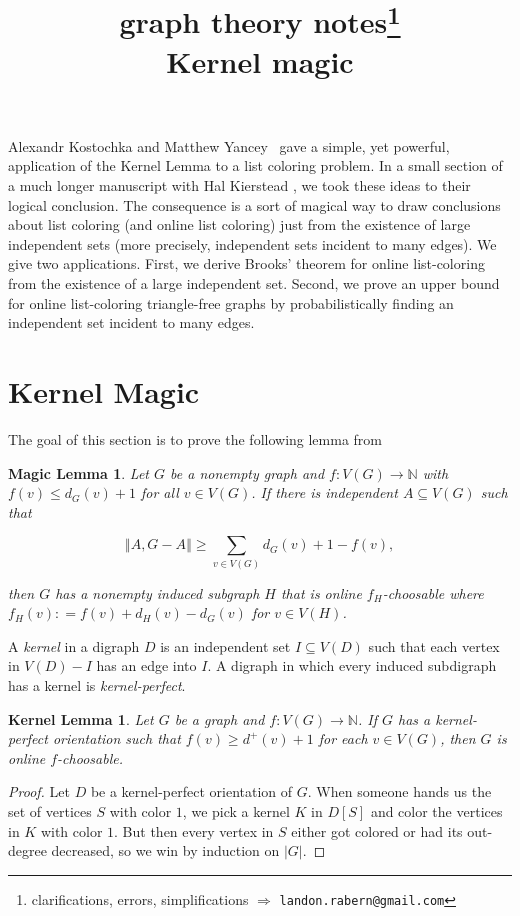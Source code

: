 \documentclass[12pt]{article}
\title{graph theory notes\thanks{clarifications, errors, simplifications $\Rightarrow$ \texttt{landon.rabern@gmail.com}}\\ \bigskip
Kernel magic}
\date{}
\theoremstyle{plain}
\newtheorem*{KernelLemma}{Kernel Lemma}
\newtheorem*{MagicLemma}{Magic Lemma}
\theoremstyle{definition}
\theoremstyle{remark}
\newcommand{\IN}{\mathbb{N}}
\newcommand{\size}[1]{\left\Vert#1\right\Vert}
\newcommand{\func}[3]{#1\colon #2 \rightarrow #3}
\newcommand{\DefinedAs}{\mathrel{\mathop:}=}
\begin{document}
\maketitle

Alexandr Kostochka and Matthew Yancey~\cite{kostochkayancey2012ore} gave a simple, yet
powerful, application of the Kernel Lemma to a list coloring problem.  
In a small section of a much longer manuscript with Hal Kierstead \cite{orevizing}, we took these ideas to their logical conclusion.  
The consequence is a sort of magical way to draw conclusions about list coloring (and online list coloring) just from the existence of large independent sets (more precisely, independent sets incident to many edges).
We give two applications. First, we derive Brooks' theorem for online list-coloring from the existence of a large independent set.  Second, we prove an upper bound for online list-coloring triangle-free graphs by probabilistically finding an independent set
incident to many edges.

\section{Kernel Magic}
The goal of this section is to prove the following lemma from \cite{orevizing}

\begin{MagicLemma}
	Let $G$ be a nonempty graph and $\func{f}{V(G)}{\IN}$ with $f(v) \le d_G(v) + 1$ for all $v \in V(G)$. If there is independent $A \subseteq V(G)$ such that
	
	\[\size{A, G-A} \ge  \sum_{v \in V(G)} d_G(v) + 1 - f(v),\]
	
	\noindent then $G$ has a nonempty induced subgraph $H$ that is online $f_H$-choosable where $f_H(v) \DefinedAs f(v) + d_H(v) - d_G(v)$ for $v \in V(H)$.
\end{MagicLemma}

A \emph{kernel} in a digraph $D$ is an independent set $I \subseteq V(D)$ such
that each vertex in $V(D) - I$ has an edge into $I$.  A digraph in which every
induced subdigraph has a kernel is \emph{kernel-perfect}.

\begin{KernelLemma}
	Let $G$ be a graph and $\func{f}{V(G)}{\IN}$. If $G$ has a kernel-perfect orientation such that $f(v) \geq d^+(v) + 1$ for each $v \in V(G)$, then $G$ is online $f$-choosable.
\end{KernelLemma}
\begin{proof}
	Let $D$ be a kernel-perfect orientation of $G$.  
	When someone hands us the set of vertices $S$ with color $1$, we pick a kernel $K$ in $D[S]$ and color the vertices in $K$ with color $1$.  
	But then every vertex in $S$ either got colored or had its out-degree decreased, so we win by induction on $|G|$.
\end{proof}
\end{document}
